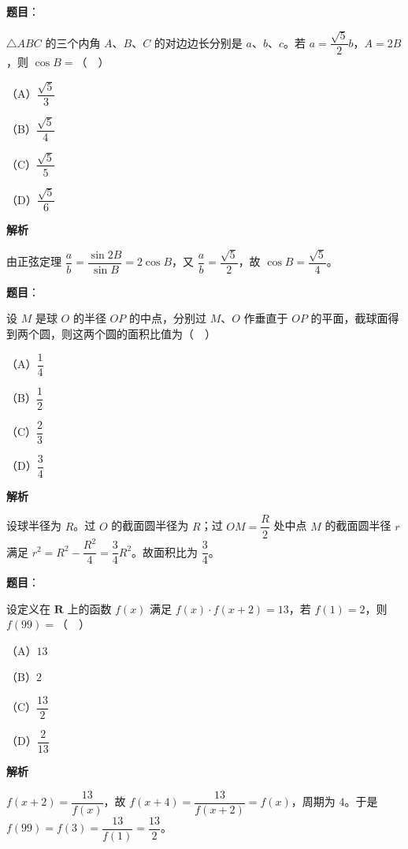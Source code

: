 \begin{answer}

\textbf{题目}：

$\triangle ABC$ 的三个内角 $A$、$B$、$C$ 的对边边长分别是 $a$、$b$、$c$。若 $a=\dfrac{\sqrt5}2b$，$A=2B$，则 $\cos B=$（　）

（A）$\dfrac{\sqrt5}3$

（B）$\dfrac{\sqrt5}4$

（C）$\dfrac{\sqrt5}5$

（D）$\dfrac{\sqrt5}6$

\textbf{解析}

由正弦定理 $\dfrac ab=\dfrac{\sin2B}{\sin B}=2\cos B$，又 $\dfrac ab=\dfrac{\sqrt5}2$，故 $\cos B=\dfrac{\sqrt5}4$。


\end{answer}
\begin{answer}

\textbf{题目}：

设 $M$ 是球 $O$ 的半径 $OP$ 的中点，分别过 $M$、$O$ 作垂直于 $OP$ 的平面，截球面得到两个圆，则这两个圆的面积比值为（　）

（A）$\dfrac14$

（B）$\dfrac12$

（C）$\dfrac23$

（D）$\dfrac34$

\textbf{解析}

设球半径为 $R$。过 $O$ 的截面圆半径为 $R$；过 $OM=\dfrac R2$ 处中点 $M$ 的截面圆半径 $r$ 满足 $r^2=R^2-\dfrac{R^2}4=\dfrac34R^2$。故面积比为 $\dfrac34$。


\end{answer}
\begin{answer}

\textbf{题目}：

设定义在 $\mathbf R$ 上的函数 $f(x)$ 满足 $f(x)\cdot f(x+2)=13$，若 $f(1)=2$，则 $f(99)=$（　）

（A）$13$

（B）$2$

（C）$\dfrac{13}2$

（D）$\dfrac2{13}$

\textbf{解析}

$f(x+2)=\dfrac{13}{f(x)}$，故 $f(x+4)=\dfrac{13}{f(x+2)}=f(x)$，周期为 $4$。于是 $f(99)=f(3)=\dfrac{13}{f(1)}=\dfrac{13}2$。


\end{answer}
